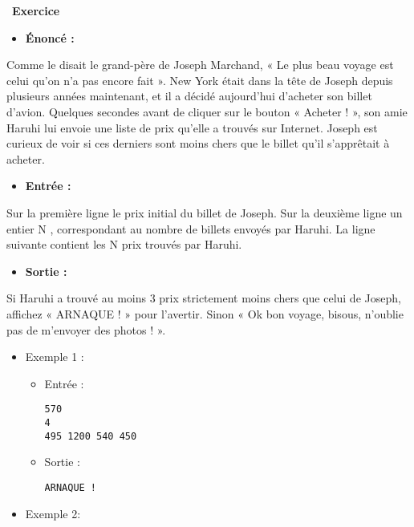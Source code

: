 \documentclass[
  11pt,
]{article}
\providecommand{\tightlist}{%
  \setlength{\itemsep}{0pt}\setlength{\parskip}{0pt}}
\newcounter{exo}
\newenvironment{exercice}[1]
{\par \medskip   \addtocounter{exo}{1} \noindent  
\begin{bclogo}[arrondi =0.1,   noborder = true, logo=\bccrayon, marge=4]{~\textbf{Exercice} \textbf{\theexo} {\itshape #1} }  \par}
{
\end{bclogo}
 \par \bigskip }
\begin{document}
\begin{exercice}{}

\begin{itemize}
\tightlist
\item
  \textbf{Énoncé :}
\end{itemize}

Comme le disait le grand-père de Joseph Marchand, « Le plus beau voyage
est celui qu'on n'a pas encore fait ». New York était dans la tête de
Joseph depuis plusieurs années maintenant, et il a décidé aujourd'hui
d'acheter son billet d'avion. Quelques secondes avant de cliquer sur le
bouton « Acheter ! », son amie Haruhi lui envoie une liste de prix
qu'elle a trouvés sur Internet. Joseph est curieux de voir si ces
derniers sont moins chers que le billet qu'il s'apprêtait à acheter.

\begin{itemize}
\tightlist
\item
  \textbf{Entrée :}
\end{itemize}

Sur la première ligne le prix initial du billet de Joseph. Sur la
deuxième ligne un entier N , correspondant au nombre de billets envoyés
par Haruhi. La ligne suivante contient les N prix trouvés par Haruhi.

\begin{itemize}
\tightlist
\item
  \textbf{Sortie :}
\end{itemize}

Si Haruhi a trouvé au moins 3 prix strictement moins chers que celui de
Joseph, affichez « ARNAQUE ! » pour l'avertir. Sinon « Ok bon voyage,
bisous, n'oublie pas de m'envoyer des photos ! ».

\begin{itemize}
\item
  Exemple 1 :

  \begin{itemize}
  \item
    Entrée :

\begin{lstlisting}
570
4
495 1200 540 450
\end{lstlisting}
  \item
    Sortie :

\begin{lstlisting}
ARNAQUE !
\end{lstlisting}
  \end{itemize}
\item
  Exemple 2:


\end{itemize}
\end{exercice}
\end{document}
